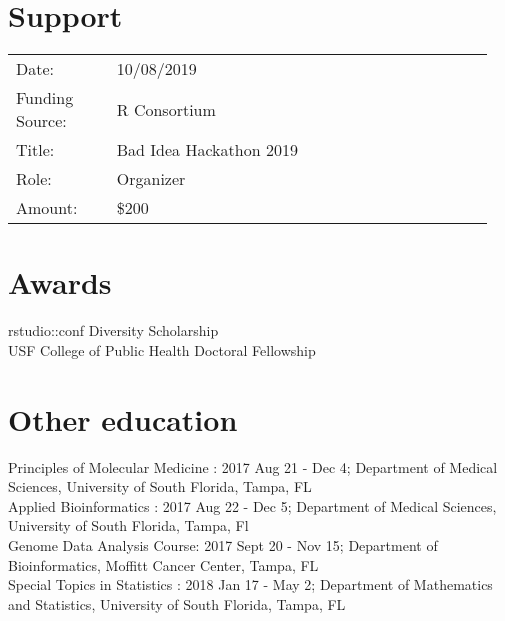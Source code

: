 \documentclass[11pt, a4paper]{article} %
\newcommand{\years}[1]{\marginnote{\scriptsize \raise .3ex\hbox{#1}}} %
\begin{document}
\section*{Support}

\begin{longtable}{@{}p{0.2\linewidth} p{0.75\linewidth}}
Date: & 10/08/2019 \\
Funding Source: &  R Consortium \\
Title: & Bad Idea Hackathon 2019 \\
Role: & Organizer \\
Amount: & \$200 \\
\end{longtable}

\section*{Awards}

\years{2018} rstudio::conf Diversity Scholarship \\
\years{2020--} USF College of Public Health Doctoral Fellowship \\


\section*{Other education}

Principles of Molecular Medicine : 2017 Aug 21 - Dec 4; Department of Medical Sciences, University of South Florida, Tampa, FL\\

Applied Bioinformatics : 2017 Aug 22 - Dec 5; Department of Medical Sciences, University of South Florida, Tampa, Fl \\

Genome Data Analysis Course:  2017 Sept 20 - Nov 15; Department of Bioinformatics, Moffitt Cancer Center, Tampa, FL \\

Special Topics in Statistics :  2018 Jan 17 -  May 2; Department of Mathematics and Statistics, University of South Florida, Tampa, FL





\end{document}
